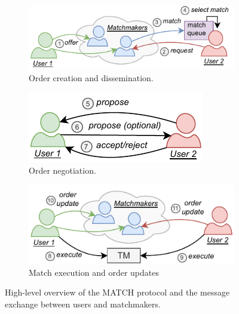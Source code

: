 
\begin{figure}[t]
	\centering
	\begin{subfigure}{.7\columnwidth}
		\centering
		\includegraphics[width=\linewidth]{match/assets/matching_protocol_1}
		\caption{Order creation and dissemination.}
		\label{fig:matching_protocol_1}
	\end{subfigure}\vspace{0.5cm}
	\begin{subfigure}{.45\columnwidth}
		\centering
		\includegraphics[width=\columnwidth]{match/assets/matching_protocol_2}
		\caption{Order negotiation.}
		\label{fig:matching_protocol_2}
	\end{subfigure}\vspace{0.5cm}
	\begin{subfigure}{.65\columnwidth}
		\centering
		\includegraphics[width=\columnwidth]{match/assets/matching_protocol_3}
		\caption{Match execution and order updates}
		\label{fig:matching_protocol_3}
	\end{subfigure}
	\caption{High-level overview of the MATCH protocol and the message exchange between users and matchmakers.}
	\label{fig:match_data_flow}
\end{figure}

